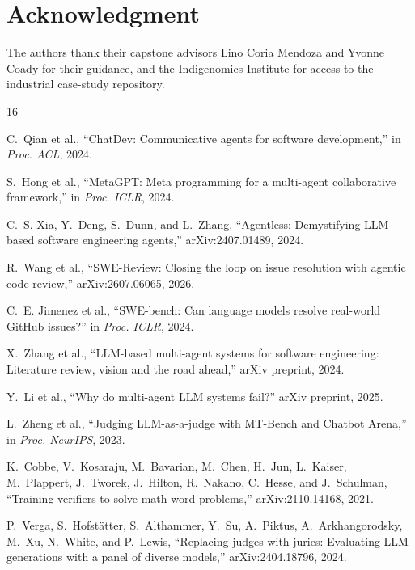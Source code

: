 \documentclass[conference]{IEEEtran}
\begin{document}
\section*{Acknowledgment}
The authors thank their capstone advisors Lino Coria Mendoza and Yvonne
Coady for their guidance, and the Indigenomics Institute for access to the
industrial case-study repository.

\begin{thebibliography}{16}

C.~Qian et al., ``ChatDev: Communicative agents for software development,''
in \emph{Proc. ACL}, 2024.

S.~Hong et al., ``MetaGPT: Meta programming for a multi-agent collaborative
framework,'' in \emph{Proc. ICLR}, 2024.

C.~S. Xia, Y.~Deng, S.~Dunn, and L.~Zhang, ``Agentless: Demystifying
LLM-based software engineering agents,'' arXiv:2407.01489, 2024.

R.~Wang et al., ``SWE-Review: Closing the loop on issue resolution with agentic
code review,'' arXiv:2607.06065, 2026.

C.~E. Jimenez et al., ``SWE-bench: Can language models resolve real-world
GitHub issues?'' in \emph{Proc. ICLR}, 2024.

X.~Zhang et al., ``LLM-based multi-agent systems for software engineering:
Literature review, vision and the road ahead,'' arXiv preprint, 2024.

Y.~Li et al., ``Why do multi-agent LLM systems fail?'' arXiv preprint, 2025.

L.~Zheng et al., ``Judging LLM-as-a-judge with MT-Bench and Chatbot Arena,''
in \emph{Proc. NeurIPS}, 2023.

K.~Cobbe, V.~Kosaraju, M.~Bavarian, M.~Chen, H.~Jun, L.~Kaiser, M.~Plappert,
J.~Tworek, J.~Hilton, R.~Nakano, C.~Hesse, and J.~Schulman, ``Training
verifiers to solve math word problems,'' arXiv:2110.14168, 2021.

P.~Verga, S.~Hofst\"atter, S.~Althammer, Y.~Su, A.~Piktus, A.~Arkhangorodsky,
M.~Xu, N.~White, and P.~Lewis, ``Replacing judges with juries: Evaluating LLM
generations with a panel of diverse models,'' arXiv:2404.18796, 2024.


\end{thebibliography}
\end{document}
